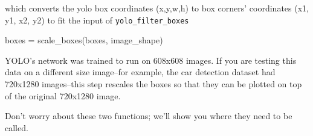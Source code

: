 \documentclass[11pt]{article}
\newenvironment{Shaded}{}{}
\newcommand{\NormalTok}[1]{{#1}}
\newcommand{\OperatorTok}[1]{\textcolor[rgb]{0.40,0.40,0.40}{{#1}}}
\begin{document}
which converts the yolo box coordinates (x,y,w,h) to box corners'
coordinates (x1, y1, x2, y2) to fit the input of
\texttt{yolo\_filter\_boxes}

\begin{Shaded}
\begin{Highlighting}[]
\NormalTok{boxes }\OperatorTok{=}\NormalTok{ scale_boxes(boxes, image_shape)}
\end{Highlighting}
\end{Shaded}

YOLO's network was trained to run on 608x608 images. If you are testing
this data on a different size image--for example, the car detection
dataset had 720x1280 images--this step rescales the boxes so that they
can be plotted on top of the original 720x1280 image.

Don't worry about these two functions; we'll show you where they need to
be called.
\end{document}
